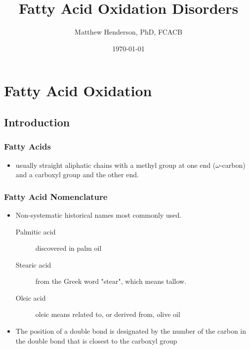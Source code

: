 \documentclass{scrartcl}
\author{Matthew Henderson, PhD, FCACB}
\date{\today}
\title{Fatty Acid Oxidation Disorders}
\begin{document}
\maketitle
\setcounter{tocdepth}{2}
\tableofcontents


\section{Fatty Acid Oxidation}
\label{sec:org64ff894}
\subsection{Introduction}
\label{sec:orga5c83d9}
\subsubsection{Fatty Acids}
\label{sec:org91c797c}
\begin{itemize}
\item usually straight aliphatic chains with a methyl group at one end
(\(\omega\)-carbon) and a carboxyl group and the other end.
\end{itemize}


\subsubsection{Fatty Acid Nomenclature}
\label{sec:orgc20f8ce}
\begin{itemize}
\item Non-systematic historical names most commonly used.
\begin{description}
\item[{Palmitic acid}] discovered in palm oil
\item[{Stearic acid}] from the Greek word "stear", which means tallow.
\item[{Oleic acid}] oleic means related to, or derived from, olive oil
\end{description}
\item The position of a double bond is designated by the number of the carbon in the double bond that is closest to the carboxyl group
\end{itemize}


\end{document}
